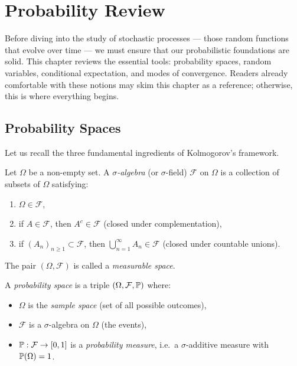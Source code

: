 \chapter{Probability Review}
\label{ch:review}

Before diving into the study of stochastic processes --- those random
functions that evolve over time --- we must ensure that our probabilistic
foundations are solid. This chapter reviews the essential tools: probability
spaces, random variables, conditional expectation, and modes of convergence.
Readers already comfortable with these notions may skim this chapter as a
reference; otherwise, this is where everything begins.

\section{Probability Spaces}

Let us recall the three fundamental ingredients of Kolmogorov's framework.

\begin{definition}
Let $\Omega$ be a non-empty set. A \emph{$\sigma$-algebra} (or $\sigma$-field)
$\mathcal{F}$ on $\Omega$ is a collection of subsets of $\Omega$ satisfying:
\begin{enumerate}
  \item $\Omega \in \mathcal{F}$,
  \item if $A \in \mathcal{F}$, then $A^c \in \mathcal{F}$ (closed under complementation),
  \item if $(A_n)_{n \geq 1} \subset \mathcal{F}$, then $\bigcup_{n=1}^{\infty} A_n \in \mathcal{F}$
    (closed under countable unions).
\end{enumerate}
The pair $(\Omega, \mathcal{F})$ is called a \emph{measurable space}.
\end{definition}

\begin{definition}
A \emph{probability space} is a triple $(\Omega, \mathcal{F}, \mathbb{P})$ where:
\begin{itemize}
  \item $\Omega$ is the \emph{sample space} (set of all possible outcomes),
  \item $\mathcal{F}$ is a $\sigma$-algebra on $\Omega$ (the events),
  \item $\mathbb{P} : \mathcal{F} \to [0,1]$ is a \emph{probability measure}, i.e.\ a
    $\sigma$-additive measure with $\mathbb{P}(\Omega) = 1$.
\end{itemize}
\end{definition}

